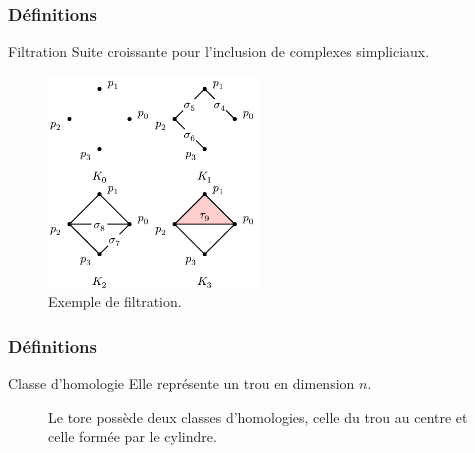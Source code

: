 \documentclass{beamer}
\begin{document}
\begin{frame}
    \frametitle{Définitions}
    \begin{block}{Filtration}
        Suite croissante pour l'inclusion de complexes simpliciaux.
    \end{block}

    \begin{figure}
        \includegraphics[width=0.5\textwidth]{../images/filtration_ex.png}
        \centering
        \caption{Exemple de filtration.}
    \end{figure}
\end{frame}
\begin{frame}
    \frametitle{Définitions}
    \begin{block}{Classe d'homologie}
        Elle représente un trou en dimension $n$.
    \end{block}

    \begin{figure}
        \caption{Le tore possède deux classes d'homologies, celle du trou au centre et celle formée par le cylindre.}
    \end{figure}
\end{frame}
\end{document}
